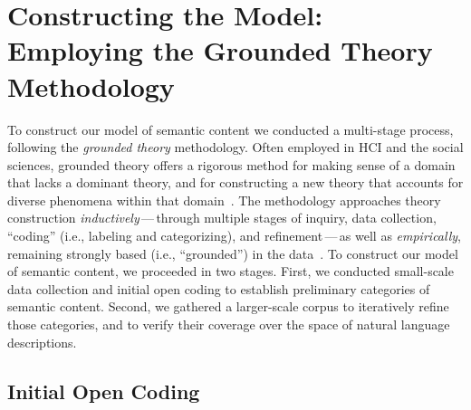 \section{Constructing the Model: Employing the Grounded Theory Methodology}
\label{section:3}

To construct our model of semantic content we conducted a multi-stage process, following the \emph{grounded theory} methodology.
Often employed in \ac{HCI} and the social sciences, grounded theory offers a rigorous method for making sense of a domain that lacks a dominant theory, and for constructing a new theory that accounts for diverse phenomena within that domain~\cite{olson_curiosity_2014}.
The methodology approaches theory construction \emph{inductively}\,---\,through multiple stages of inquiry, data collection, ``coding'' (i.e., labeling and categorizing), and refinement\,---\,as well as \emph{empirically}, remaining strongly based (i.e., ``grounded'') in the data~\cite{olson_curiosity_2014}.
To construct our model of semantic content, we proceeded in two stages.
First, we conducted small-scale data collection and initial open coding to establish preliminary categories of semantic content.
Second, we gathered a larger-scale corpus to iteratively refine those categories, and to verify their coverage over the space of natural language descriptions.

\subsection{Initial Open Coding}
\label{section:3.1}

